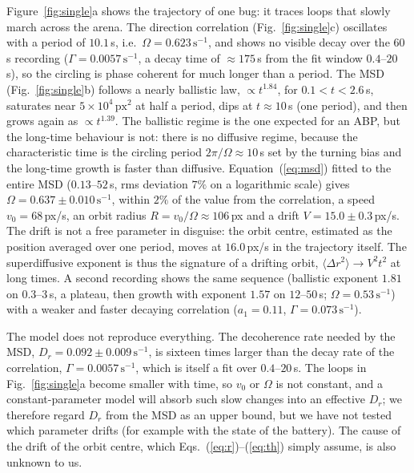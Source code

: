 \documentclass[11pt]{article}
\begin{document}
Figure~\ref{fig:single}a shows the trajectory of one bug: it traces loops that slowly march across the arena.
The direction correlation (Fig.~\ref{fig:single}c) oscillates with a period of $10.1\,$s, i.e.\ $\Omega=0.623\,\mathrm{s^{-1}}$, and shows no visible decay over the $60\,$s recording ($\Gamma=0.0057\,\mathrm{s^{-1}}$, a decay time of $\approx175\,$s from the fit window $0.4$--$20\,$s), so the circling is phase coherent for much longer than a period.
The MSD (Fig.~\ref{fig:single}b) follows a nearly ballistic law, $\propto t^{1.84}$, for $0.1<t<2.6\,$s, saturates near $5\times10^4\,\mathrm{px^2}$ at half a period, dips at $t\approx10\,$s (one period), and then grows again as $\propto t^{1.39}$.
The ballistic regime is the one expected for an ABP, but the long-time behaviour is not: there is no diffusive regime, because the characteristic time is the circling period $2\pi/\Omega\approx10\,$s set by the turning bias and the long-time growth is faster than diffusive.
Equation~(\ref{eq:msd}) fitted to the entire MSD ($0.13$--$52\,$s, rms deviation $7\%$ on a logarithmic scale) gives $\Omega=0.637\pm0.010\,\mathrm{s^{-1}}$, within $2\%$ of the value from the correlation, a speed $v_0=68\,$px/s, an orbit radius $R=v_0/\Omega\approx106\,$px and a drift $V=15.0\pm0.3\,$px/s.
The drift is not a free parameter in disguise: the orbit centre, estimated as the position averaged over one period, moves at $16.0\,$px/s in the trajectory itself.
The superdiffusive exponent is thus the signature of a drifting orbit, $\langle\Delta r^2\rangle\to V^2t^2$ at long times.
A second recording shows the same sequence (ballistic exponent $1.81$ on $0.3$--$3\,$s, a plateau, then growth with exponent $1.57$ on $12$--$50\,$s; $\Omega=0.53\,\mathrm{s^{-1}}$) with a weaker and faster decaying correlation ($a_1=0.11$, $\Gamma=0.073\,\mathrm{s^{-1}}$).

The model does not reproduce everything.
The decoherence rate needed by the MSD, $D_r=0.092\pm0.009\,\mathrm{s^{-1}}$, is sixteen times larger than the decay rate of the correlation, $\Gamma=0.0057\,\mathrm{s^{-1}}$, which is itself a fit over $0.4$--$20\,$s.
The loops in Fig.~\ref{fig:single}a become smaller with time, so $v_0$ or $\Omega$ is not constant, and a constant-parameter model will absorb such slow changes into an effective $D_r$; we therefore regard $D_r$ from the MSD as an upper bound, but we have not tested which parameter drifts (for example with the state of the battery).
The cause of the drift of the orbit centre, which Eqs.~(\ref{eq:r})--(\ref{eq:th}) simply assume, is also unknown to us.
\end{document}
